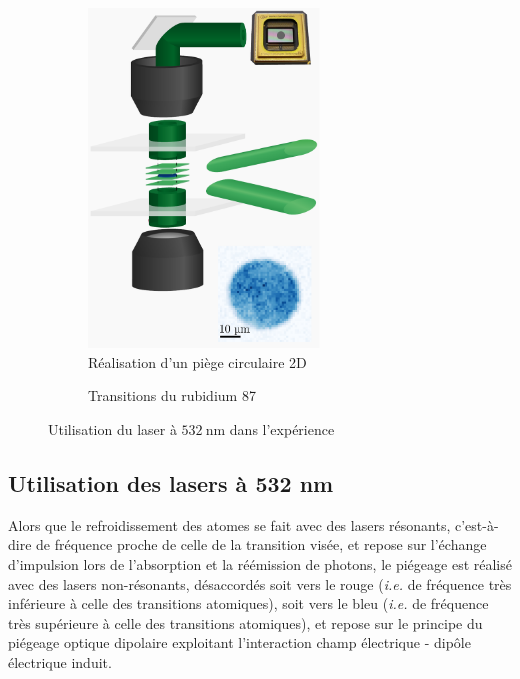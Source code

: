 \documentclass[11pt,a4paper] { article}
\newcommand{\lmbd}[1]{$\SI{#1}{\nano\metre}$}
\begin{document}
\begin{figure}[htbp] 
	\centering
	\begin{subfigure}[b]{0.48\textwidth}
    	\centering
    	\small
	\includegraphics[height=9cm]{img/accordeon-dmd.pdf}
	\caption{\small Réalisation d'un piège circulaire 2D \footnotemark}
		\label{fig:accordeon}
	\end{subfigure}	
	\begin{subfigure}[b]{0.48\textwidth}
		\centering
		\small
		\resizebox{!}{9cm}{
   			
		}
		\caption{\small Transitions du rubidium 87}
		\label{fig:transitions}
	\end{subfigure}

	\caption{\small Utilisation du laser à \lmbd{532} dans l'expérience}
\end{figure}



\subsection{Utilisation des lasers à 532 nm}

Alors que le refroidissement des atomes se fait avec des lasers résonants, c'est-à-dire de fréquence proche de celle de la transition visée, et repose sur l'échange d'impulsion lors de l'absorption et la réémission de photons, le piégeage est réalisé avec des lasers non-résonants, désaccordés soit vers le rouge (\textit{i.e.} de fréquence très inférieure à celle des transitions atomiques), soit vers le bleu (\textit{i.e.} de fréquence très supérieure à celle des transitions atomiques), et repose sur le principe du piégeage optique dipolaire exploitant l'interaction champ électrique - dipôle électrique induit.
\end{document}
